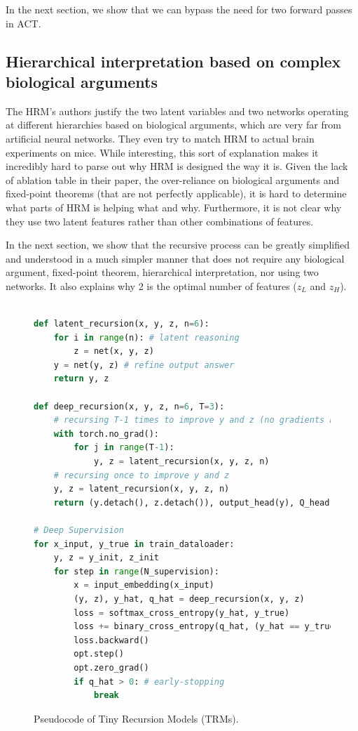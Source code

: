 \documentclass{article}
\theoremstyle{plain}
\theoremstyle{definition}
\theoremstyle{remark}
\begin{document}
In the next section, we show that we can bypass the need for two forward passes in ACT.

\subsection{Hierarchical interpretation based on complex biological arguments}

The HRM's authors justify the two latent variables and two networks operating at different hierarchies based on biological arguments, which are very far from artificial neural networks. They even try to match HRM to actual brain experiments on mice. While interesting, this sort of explanation makes it incredibly hard to parse out why HRM is designed the way it is. Given the lack of ablation table in their paper, the over-reliance on biological arguments and fixed-point theorems (that are not perfectly applicable), it is hard to determine what parts of HRM is helping what and why. Furthermore, it is not clear why they use two latent features rather than other combinations of features.

In the next section, we show that the recursive process can be greatly simplified and understood in a much simpler manner that does not require any biological argument, fixed-point theorem, hierarchical interpretation, nor using two networks. It also explains why 2 is the optimal number of features ($z_L$ and $z_H$).

\begin{figure}[h]
  \centering
    \begin{lstlisting}[language=python]

def latent_recursion(x, y, z, n=6):
    for i in range(n): # latent reasoning
        z = net(x, y, z)
    y = net(y, z) # refine output answer
    return y, z
    
def deep_recursion(x, y, z, n=6, T=3):
    # recursing T-1 times to improve y and z (no gradients needed)
    with torch.no_grad():
        for j in range(T-1):
            y, z = latent_recursion(x, y, z, n)
    # recursing once to improve y and z
    y, z = latent_recursion(x, y, z, n)
    return (y.detach(), z.detach()), output_head(y), Q_head(y)

# Deep Supervision
for x_input, y_true in train_dataloader:
    y, z = y_init, z_init
    for step in range(N_supervision):
        x = input_embedding(x_input)
        (y, z), y_hat, q_hat = deep_recursion(x, y, z)
        loss = softmax_cross_entropy(y_hat, y_true)
        loss += binary_cross_entropy(q_hat, (y_hat == y_true))
        loss.backward()
        opt.step()
        opt.zero_grad()
        if q_hat > 0: # early-stopping
            break
    \end{lstlisting}
  \caption{Pseudocode of Tiny Recursion Models (TRMs).}
  \label{fig:pseudocode2}
\end{figure}
\end{document}
